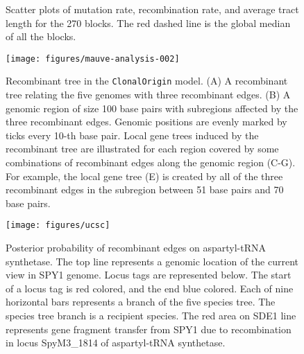 \documentclass[english]{article}
\newcommand{\lyxdot}{.}
\begin{document}
\begin{figure}


\caption{\label{fig:scatter3}Scatter plots of mutation rate, recombination
rate, and average tract length for the 270 blocks. The red dashed
line is the global median of all the blocks.}
\end{figure}
\clearpage{}%

\begin{figure}
\texttt{[image: figures/mauve-analysis-002]}
\caption{\label{fig:clonalorigin}Recombinant tree in the \texttt{ClonalOrigin} model.
(A) A recombinant tree relating the five genomes with three recombinant edges.
(B) A genomic region of size 100 base pairs with subregions affected by the
three recombinant edges. Genomic positions are evenly marked by ticks every 
10-th base pair. Local gene trees induced by the recombinant tree are
illustrated for each region covered by some combinations of recombinant edges
along the genomic region (C-G). For example, the local gene tree (E) is created
by all of the three recombinant edges in the subregion between 51 base pairs
and 70 base pairs.}
\end{figure}

\begin{figure}
\texttt{[image: figures/ucsc]}
\caption{\label{fig:muts}Posterior probability of recombinant edges on 
aspartyl-tRNA
synthetase.  The
top line represents a genomic location of the current view in SPY1 genome. Locus
tags are represented below. The start of a locus tag is red colored, and the end
blue colored. Each of nine horizontal bars represents a branch of the five
species tree. The species tree branch is a recipient species.
The red area on SDE1 line represents gene fragment transfer from
SPY1 due to recombination in locus SpyM3\_1814 of aspartyl-tRNA synthetase.}
\end{figure}
\clearpage{}%
\end{document}
